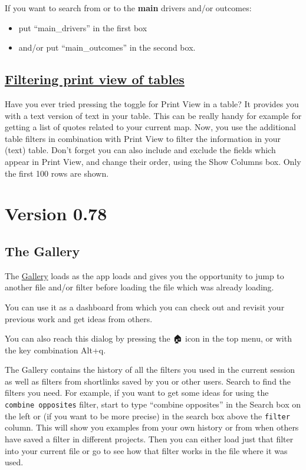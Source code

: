 \documentclass[
]{book}
\providecommand{\tightlist}{%
  \setlength{\itemsep}{0pt}\setlength{\parskip}{0pt}}
\begin{document}
If you want to search from or to the \textbf{main} drivers and/or outcomes:

\begin{itemize}
\tightlist
\item
  put ``main\_drivers'' in the first box
\item
  and/or put ``main\_outcomes'' in the second box.
\end{itemize}

\hypertarget{filtering-print-view-of-tables-1}{%
\subsection{\texorpdfstring{\protect\hyperlink{xprint-view-tables}{Filtering print view of tables}}{Filtering print view of tables}}\label{filtering-print-view-of-tables-1}}

Have you ever tried pressing the toggle for Print View in a table? It provides you with a text version of text in your table. This can be really handy for example for getting a list of quotes related to your current map. Now, you use the additional table filters in combination with Print View to filter the information in your (text) table. Don't forget you can also include and exclude the fields which appear in Print View, and change their order, using the Show Columns box. Only the first 100 rows are shown.

\hypertarget{version-0.78}{%
\section{Version 0.78}\label{version-0.78}}

\hypertarget{the-gallery}{%
\subsection{The Gallery}\label{the-gallery}}

The \protect\hyperlink{xgallery}{Gallery} loads as the app loads and gives you the opportunity to jump to another file and/or filter before loading the file which was already loading.

You can use it as a dashboard from which you can check out and revisit your previous work and get ideas from others.

You can also reach this dialog by pressing the 🏠 icon in the top menu, or with the key combination Alt+q.

The Gallery contains the history of all the filters you used in the current session as well as filters from shortlinks saved by you or other users. Search to find the filters you need. For example, if you want to get some ideas for using the \texttt{combine\ opposites} filter, start to type ``combine opposites'' in the Search box on the left or (if you want to be more precise) in the search box above the \texttt{filter} column. This will show you examples from your own history or from when others have saved a filter in different projects. Then you can either load just that filter into your current file or go to see how that filter works in the file where it was used.
\end{document}
